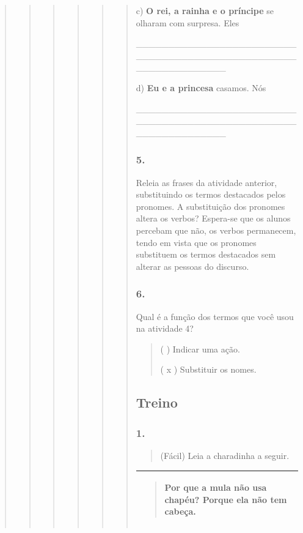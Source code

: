 \begin{quote}
\begin{quote}
\begin{quote}
\begin{quote}
\begin{quote}
\begin{quote}
c) \textbf{O rei, a rainha e o príncipe} se olharam com surpresa. Eles

\_\_\_\_\_\_\_\_\_\_\_\_\_\_\_\_\_\_\_\_\_\_\_\_\_\_\_\_\_\_\_\_\_\_\_\_\_\_\_\_\_\_\_\_\_\_\_\_\_\_\_\_\_\_\_\_\_\_\_\_\_\_\_\_

d) \textbf{Eu e a princesa} casamos. Nós

\_\_\_\_\_\_\_\_\_\_\_\_\_\_\_\_\_\_\_\_\_\_\_\_\_\_\_\_\_\_\_\_\_\_\_\_\_\_\_\_\_\_\_\_\_\_\_\_\_\_\_\_\_\_\_\_\_\_\_\_\_\_\_\_

\subsubsection{5. }\label{section-75}

Releia as frases da atividade anterior, substituindo os termos
destacados pelos pronomes. A substituição dos pronomes altera os verbos?
Espera-se que os alunos percebam que não, os verbos permanecem, tendo em
vista que os pronomes substituem os termos destacados sem alterar as
pessoas do discurso.

\subsubsection{6. }\label{section-76}

Qual é a função dos termos que você usou na atividade 4?

\begin{quote}
( ) Indicar uma ação.

( x ) Substituir os nomes.
\end{quote}

\subsection{Treino}\label{treino-9}

\subsubsection{1.}\label{section-77}

\begin{quote}
(Fácil) Leia a charadinha a seguir.
\end{quote}

\begin{longtable}[]{@{}l@{}}
\toprule
\begin{minipage}[t]{0.97\columnwidth}\raggedright\strut
\begin{quote}
Por que a mula não usa chapéu? Porque ela não tem cabeça.
\end{quote}\strut
\end{minipage}\tabularnewline
\bottomrule
\end{longtable}


\end{quote}
\end{quote}
\end{quote}
\end{quote}
\end{quote}
\end{quote}
